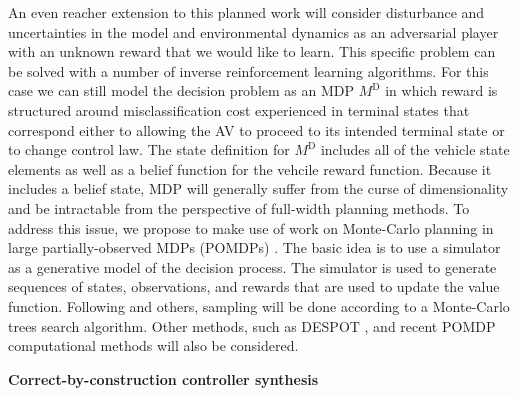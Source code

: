  An even reacher extension to this planned work will consider disturbance and uncertainties in the model and environmental dynamics as an adversarial player with an unknown reward that we would like to learn. This specific problem can be solved with a number of inverse reinforcement learning algorithms. 
For this case we can still model the decision problem as an MDP $M^{\mbox{D}}$ in which reward is structured around misclassification cost experienced in terminal states that correspond either to allowing the AV to proceed to its intended terminal state or to change control law. The state definition for $M^{\mbox{D}}$ includes all of the vehicle state elements as well as a belief function for the vehcile reward function.
Because it includes a belief state, MDP will generally suffer from the curse of dimensionality and be intractable from the perspective of full-width planning methods.  To address this issue, we propose to make use of  work on Monte-Carlo planning in large partially-observed MDPs (POMDPs) \cite{silver2010monte}.  The basic idea is to use a simulator as a generative model of the decision process.  The simulator is used to generate sequences of states, observations, and rewards that are used to update the value function.  
Following \cite{silver2010monte} and others, sampling will be done according to a Monte-Carlo trees search algorithm.  Other methods, such as DESPOT  \cite{somani2013despot}, and  recent POMDP computational methods \cite{baier2012nested,guez2012efficient,guez2013scalable,vien2013monte}  will also be considered.


\noindent\textbf{Correct-by-construction controller synthesis}

